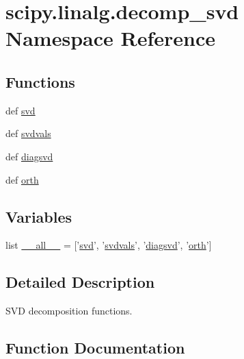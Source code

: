 \hypertarget{namespacescipy_1_1linalg_1_1decomp__svd}{}\section{scipy.\+linalg.\+decomp\+\_\+svd Namespace Reference}
\label{namespacescipy_1_1linalg_1_1decomp__svd}
\subsection*{Functions}
\begin{DoxyCompactItemize}
\item 
def \hyperlink{namespacescipy_1_1linalg_1_1decomp__svd_a1d4ce639a3f2e2bc9f2f035a3355639c}{svd}
\item 
def \hyperlink{namespacescipy_1_1linalg_1_1decomp__svd_a81400bb2f5c2a09055f82c692fa56df8}{svdvals}
\item 
def \hyperlink{namespacescipy_1_1linalg_1_1decomp__svd_a6462b146a9ff3bcad5be37c67933ebfd}{diagsvd}
\item 
def \hyperlink{namespacescipy_1_1linalg_1_1decomp__svd_a93b5577f27f7966fe0af61ac32b3f295}{orth}
\end{DoxyCompactItemize}
\subsection*{Variables}
\begin{DoxyCompactItemize}
\item 
list \hyperlink{namespacescipy_1_1linalg_1_1decomp__svd_ac1789ea757919572c6d33eff59ea048e}{\+\_\+\+\_\+all\+\_\+\+\_\+} = \mbox{[}'\hyperlink{namespacescipy_1_1linalg_1_1decomp__svd_a1d4ce639a3f2e2bc9f2f035a3355639c}{svd}', '\hyperlink{namespacescipy_1_1linalg_1_1decomp__svd_a81400bb2f5c2a09055f82c692fa56df8}{svdvals}', '\hyperlink{namespacescipy_1_1linalg_1_1decomp__svd_a6462b146a9ff3bcad5be37c67933ebfd}{diagsvd}', '\hyperlink{namespacescipy_1_1linalg_1_1decomp__svd_a93b5577f27f7966fe0af61ac32b3f295}{orth}'\mbox{]}
\end{DoxyCompactItemize}


\subsection{Detailed Description}
\begin{DoxyVerb}SVD decomposition functions.\end{DoxyVerb}
 

\subsection{Function Documentation}
\hypertarget{namespacescipy_1_1linalg_1_1decomp__svd_a6462b146a9ff3bcad5be37c67933ebfd}{}
